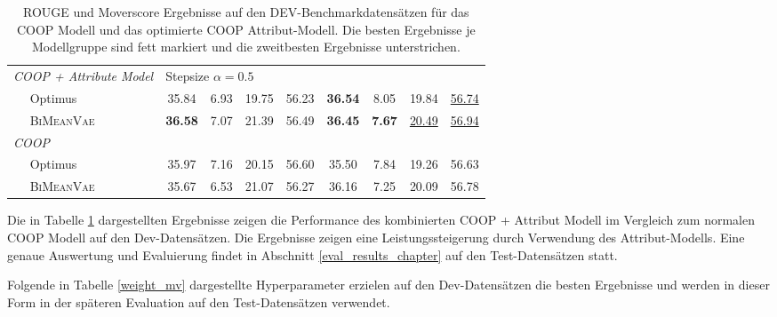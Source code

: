 \begin{table}[!h]
\begin{tabular}{@{}lcccc|cccc@{}}
    \textit{COOP + Attribute Model}        &    \multicolumn{3}{l}{Stepsize $\alpha= 0.5$}            &        &   & &     \\
    $\quad$ Optimus            & 35.84  &6.93 & 19.75& 56.23&   \textbf{36.54}  &   8.05   &19.84   & \underline{56.74}  \\ 
    $\quad$ \textsc{BiMeanVae}& \textbf{36.58} & 7.07 & 21.39 & 56.49 & \textbf{36.45} & \textbf{7.67} & \underline{20.49}& \underline{56.94} \\ \midrule %

    \textit{COOP}              &         &         &        &        &        & &   &    \\
    $\quad$ Optimus        & 35.97 & 7.16 & 20.15 & 56.60 & 35.50  & 7.84  & 19.26 & 56.63\\  %
    $\quad$ \textsc{BiMeanVae} &  35.67 &6.53 & 21.07 & 56.27 & 36.16 & 7.25 & 20.09 & 56.78\\ 
    
    	\bottomrule
    
    \end{tabular}
    \caption{ROUGE und Moverscore Ergebnisse auf den DEV-Benchmarkdatensätzen für das COOP Modell und das optimierte COOP Attribut-Modell. Die besten Ergebnisse je Modellgruppe sind fett markiert und die zweitbesten Ergebnisse unterstrichen.
    }
    \label{dev_eval_results}
\end{table}

Die in Tabelle \ref{dev_eval_results} dargestellten Ergebnisse zeigen die Performance des kombinierten COOP + Attribut Modell im Vergleich zum normalen COOP Modell auf den Dev-Datensätzen.
Die Ergebnisse zeigen eine Leistungssteigerung durch Verwendung des Attribut-Modells. Eine genaue Auswertung und Evaluierung findet in Abschnitt \ref{eval_results_chapter} auf den Test-Datensätzen statt.

\pagebreak
Folgende in Tabelle \ref{weight_mv} dargestellte Hyperparameter erzielen auf den Dev-Datensätzen die besten Ergebnisse und werden in dieser Form in der späteren Evaluation auf den Test-Datensätzen verwendet.

